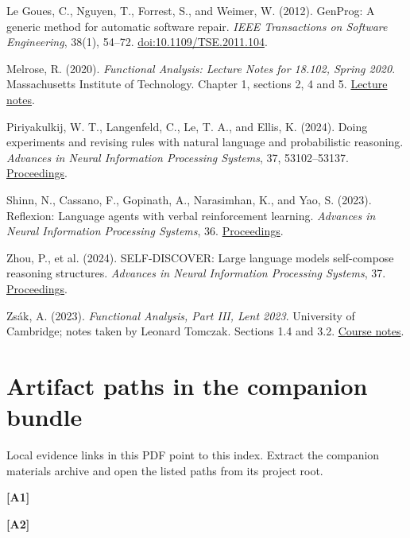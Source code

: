 \documentclass[11pt,a4paper]{article}
\begin{document}
Le Goues, C., Nguyen, T., Forrest, S., and Weimer, W. (2012). GenProg: A generic method for automatic software repair. \emph{IEEE Transactions on Software Engineering}, 38(1), 54–72. \href{https://doi.org/10.1109/TSE.2011.104}{doi:10.1109/TSE.2011.104}.


Melrose, R. (2020). \emph{Functional Analysis: Lecture Notes for 18.102, Spring 2020}. Massachusetts Institute of Technology. Chapter 1, sections 2, 4 and 5. \href{https://ocw.mit.edu/courses/18-102-introduction-to-functional-analysis-spring-2021/3d4cc88026d44a01f936cd6a0aa995cb_MIT18_102s20_lec_FA.pdf}{Lecture notes}.


Piriyakulkij, W. T., Langenfeld, C., Le, T. A., and Ellis, K. (2024). Doing experiments and revising rules with natural language and probabilistic reasoning. \emph{Advances in Neural Information Processing Systems}, 37, 53102–53137. \href{https://papers.nips.cc/paper_files/paper/2024/hash/5f1b350fc0c2affd56f465faa36be343-Abstract-Conference.html}{Proceedings}.


Shinn, N., Cassano, F., Gopinath, A., Narasimhan, K., and Yao, S. (2023). Reflexion: Language agents with verbal reinforcement learning. \emph{Advances in Neural Information Processing Systems}, 36. \href{https://proceedings.neurips.cc/paper_files/paper/2023/hash/1b44b878bb782e6954cd888628510e90-Abstract-Conference.html}{Proceedings}.


Zhou, P., et al. (2024). SELF-DISCOVER: Large language models self-compose reasoning structures. \emph{Advances in Neural Information Processing Systems}, 37. \href{https://proceedings.nips.cc/paper_files/paper/2024/hash/e41efb03e20ca3c231940a3c6917ef6f-Abstract-Conference.html}{Proceedings}.


Zsák, A. (2023). \emph{Functional Analysis, Part III, Lent 2023}. University of Cambridge; notes taken by Leonard Tomczak. Sections 1.4 and 3.2. \href{https://math.berkeley.edu/~ltomczak/notes/Lent2023/FuncAna_Notes.pdf}{Course notes}.


\endgroup

\section*{Artifact paths in the companion bundle}
Local evidence links in this PDF point to this index. Extract the companion materials archive and open the listed paths from its project root.

\par\hypertarget{artifact-1}{}\textbf{[A1]} 

\par\hypertarget{artifact-2}{}\textbf{[A2]} 
\end{document}
